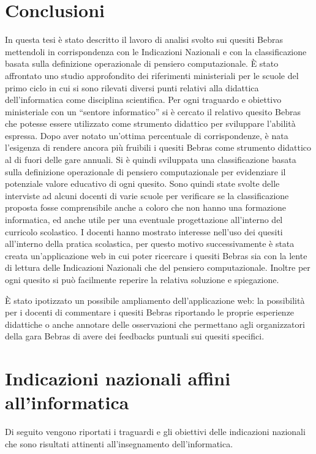 \documentclass[12pt]{report}
\begin{document}
\chapter*{Conclusioni}
In questa tesi è stato descritto il lavoro di analisi svolto sui quesiti Bebras mettendoli in corrispondenza con le Indicazioni Nazionali e con la classificazione basata sulla definizione operazionale di pensiero computazionale. \`{E} stato affrontato uno studio approfondito dei riferimenti ministeriali per le scuole del primo ciclo in cui si sono rilevati diversi punti relativi alla didattica dell'informatica come disciplina scientifica. Per ogni traguardo e obiettivo ministeriale con un ``sentore informatico'' si è cercato il relativo quesito Bebras che potesse essere utilizzato come strumento didattico per sviluppare l'abilità espressa. Dopo aver notato un'ottima percentuale di corrispondenze, è nata l'esigenza di rendere ancora più fruibili i quesiti Bebras come strumento didattico al di fuori delle gare annuali. Si è quindi sviluppata una classificazione basata sulla definizione operazionale di pensiero computazionale per evidenziare il potenziale valore educativo di ogni quesito.
Sono quindi state svolte delle interviste ad alcuni docenti di varie scuole per verificare se la classificazione proposta fosse comprensibile anche a coloro che non hanno una formazione informatica, ed anche utile per una eventuale progettazione all'interno del curricolo scolastico.
I docenti hanno mostrato interesse nell'uso dei quesiti all'interno della pratica scolastica, per questo motivo successivamente è stata creata un'applicazione web in cui poter ricercare i quesiti Bebras sia con la lente di lettura delle Indicazioni Nazionali che del pensiero computazionale. Inoltre per ogni quesito si può facilmente reperire la relativa soluzione e spiegazione.

\`{E} stato ipotizzato un possibile ampliamento dell'applicazione web: la possibilità per i docenti di commentare i quesiti Bebras riportando le proprie esperienze didattiche 
o anche annotare delle osservazioni che permettano agli organizzatori della gara Bebras di avere dei feedbacks puntuali sui quesiti specifici.


\appendix

\chapter{Indicazioni nazionali affini all'informatica} \label{ElencoIndicazioni}
Di seguito vengono riportati i traguardi e gli obiettivi delle indicazioni nazionali \cite{indicazioniNazionali} che sono risultati attinenti all'insegnamento dell'informatica.
\end{document}
